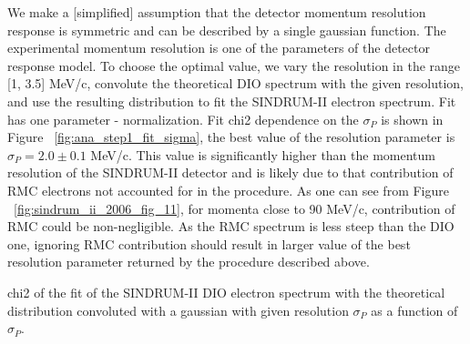 \vspace{0.2in}
We make a [simplified] assumption that the detector momentum resolution response
is symmetric and can be described by a single gaussian function. 
The experimental momentum resolution is one of the parameters of the detector response model.
To choose the optimal value, we vary the resolution in the range [1, 3.5] MeV/c, convolute the
theoretical DIO spectrum with the given resolution, and use the resulting distribution to fit
the SINDRUM-II electron spectrum. Fit has one parameter - normalization. Fit chi2 dependence
on the $\sigma_P$ is shown in Figure ~\ref{fig:ana_step1_fit_sigma}, the best value of the resolution
parameter is $\sigma_P = 2.0 \pm 0.1$ MeV/c. This value is significantly higher than the momentum
resolution of the SINDRUM-II detector and is likely due to that contribution of RMC electrons
not accounted for in the procedure. As one can see from Figure ~\ref{fig:sindrum_ii_2006_fig_11},
for momenta close to 90 MeV/c, contribution of RMC could be non-negligible. As the RMC spectrum
is less steep than the DIO one, ignoring RMC contribution should result in larger value of the
best resolution parameter returned by the procedure described above.

\vspace{0.2in}
%
 {
  \label{fig:ana_step1_fit_sigma}
  chi2 of the fit of the SINDRUM-II DIO electron spectrum with the theoretical distribution
  convoluted with a gaussian with given resolution $\sigma_P$ as a function of $\sigma_P$.
}
\vspace{0.2in}

